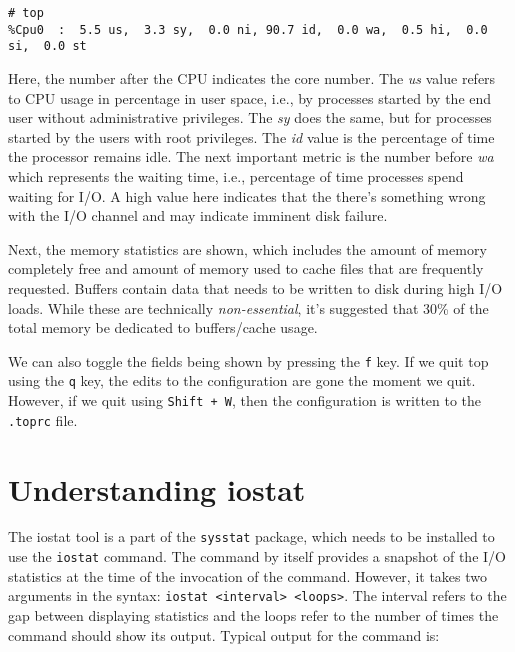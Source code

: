 \vspace{-15pt}
\begin{verbatim}
# top
%Cpu0  :  5.5 us,  3.3 sy,  0.0 ni, 90.7 id,  0.0 wa,  0.5 hi,  0.0 si,  0.0 st
\end{verbatim}
\vspace{-10pt}	

\noindent
Here, the number after the CPU indicates the core number. The \textit{us} value refers to CPU usage in percentage in user space, i.e., by processes started by the end user without administrative privileges. The \textit{sy} does the same, but for processes started by the users with root privileges. The \textit{id} value is the percentage of time the processor remains idle. The next important metric is the number before \textit{wa} which represents the waiting time, i.e., percentage of time processes spend waiting for I/O. A high value here indicates that the there's something wrong with the I/O channel and may indicate imminent disk failure. 

Next, the memory statistics are shown, which includes the amount of memory completely free and amount of memory used to cache files that are frequently requested. Buffers contain data that needs to be written to disk during high I/O loads. While these are technically \textit{non-essential}, it's suggested that 30\% of the total memory be dedicated to buffers/cache usage. 

We can also toggle the fields being shown by pressing the \verb|f| key. If we quit top using the \verb|q| key, the edits to the configuration are gone the moment we quit. However, if we quit using \verb|Shift + W|, then the configuration is written to the \verb|.toprc| file. 

	\section{Understanding iostat}
The iostat tool is a part of the \verb|sysstat| package, which needs to be installed to use the \verb|iostat| command. The command by itself provides a snapshot of the I/O statistics at the time of the invocation of the command. However, it takes two arguments in the syntax: \verb|iostat <interval> <loops>|. The interval refers to the gap between displaying statistics and the loops refer to the number of times the command should show its output. Typical output for the command is:

